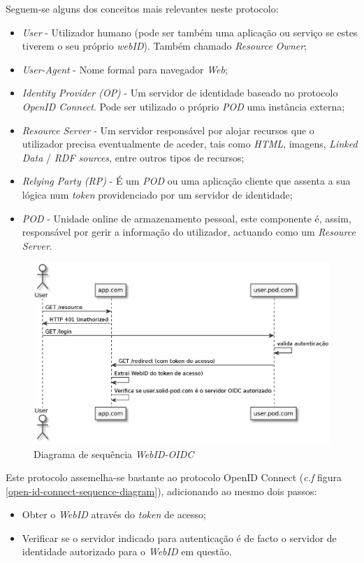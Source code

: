 Seguem-se alguns dos conceitos mais relevantes neste protocolo:
\begin{itemize}
    \item \emph{User} - Utilizador humano (pode ser também uma aplicação ou serviço se estes tiverem o seu próprio \emph{webID}). Também chamado \emph{Resource Owner};
    \item \emph{User-Agent} - Nome formal para navegador \emph{Web};
    \item \emph{Identity Provider (OP)} - Um servidor de identidade baseado no protocolo \emph{OpenID Connect}. Pode ser utilizado o próprio \emph{\acrshort{POD}} uma instância externa;
    \item \emph{Resource Server} - Um servidor responsável por alojar recursos que o utilizador precisa eventualmente de aceder, tais como \emph{HTML}, imagens, \emph{Linked Data} / \emph{RDF sources}, entre outros tipos de recursos;
    \item \emph{Relying Party (RP)} - É um \emph{\acrshort{POD}} ou uma aplicação cliente que assenta a sua lógica num \emph{token} providenciado por um servidor de identidade;
    \item \emph{\acrshort{POD}} - Unidade online de armazenamento pessoal, este componente é, assim, responsável por gerir a informação do utilizador, actuando como um \emph{Resource Server}.
\end{itemize}

\begin{figure}[H]
    \centering
    \includegraphics[width=0.8 \textwidth]{figures/WebId-OIDC}
    \caption{Diagrama de sequência \emph{WebID-OIDC}}
    \label{web-id-oidc-sequence-diagram}
\end{figure}

Este protocolo assemelha-se bastante ao protocolo OpenID Connect (\emph{c.f} figura \ref{open-id-connect-sequence-diagram}), adicionando ao mesmo dois passos\cite{solid_webid_oidc}:
\begin{itemize}
    \item Obter o \emph{WebID} através do \emph{token} de acesso;
    \item Verificar se o servidor indicado para autenticação é de facto o servidor de identidade autorizado para o \emph{WebID} em questão.
\end{itemize}

